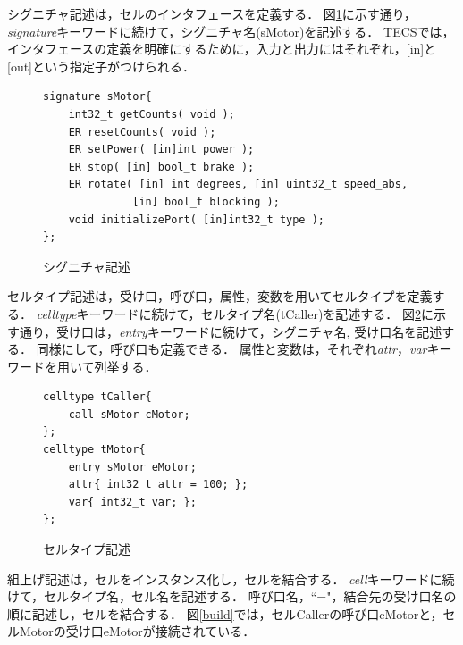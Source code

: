 \documentclass[submit,techrep]{ipsj}
\begin{document}
        シグニチャ記述は，セルのインタフェースを定義する．
        図\ref{signature}に示す通り，{\it signature}キーワードに続けて，シグニチャ名(sMotor)を記述する．
        TECSでは，インタフェースの定義を明確にするために，入力と出力にはそれぞれ，[in]と[out]という指定子がつけられる．
        
\begin{figure}[t]
\centering
\begin{lstlisting}
signature sMotor{
    int32_t getCounts( void );
    ER resetCounts( void );
    ER setPower( [in]int power );
    ER stop( [in] bool_t brake );
    ER rotate( [in] int degrees, [in] uint32_t speed_abs,
              [in] bool_t blocking );
    void initializePort( [in]int32_t type );
};
\end{lstlisting}
    \vspace{-2mm}
\caption{シグニチャ記述}
\vspace{-5mm}
\label{signature}
\end{figure}

        セルタイプ記述は，受け口，呼び口，属性，変数を用いてセルタイプを定義する．
        {\it celltype}キーワードに続けて，セルタイプ名(tCaller)を記述する．
        図\ref{celltype}に示す通り，受け口は，{\it entry}キーワードに続けて，シグニチャ名, 受け口名を記述する．
        同様にして，呼び口も定義できる．
        属性と変数は，それぞれ{\it attr}，{\it var}キーワードを用いて列挙する．

\begin{figure}[t]
\centering
\begin{lstlisting}
celltype tCaller{
    call sMotor cMotor;
};
celltype tMotor{
    entry sMotor eMotor;
    attr{ int32_t attr = 100; };
    var{ int32_t var; };
};
\end{lstlisting}
    \vspace{-2mm}
\caption{セルタイプ記述}  
\vspace{-4mm}
\label{celltype}
\end{figure}

        組上げ記述は，セルをインスタンス化し，セルを結合する．
        {\it cell}キーワードに続けて，セルタイプ名，セル名を記述する．
        呼び口名，``="，結合先の受け口名の順に記述し，セルを結合する．
        図\ref{build}では，セルCallerの呼び口cMotorと，セルMotorの受け口eMotorが接続されている．
        
\end{document}
